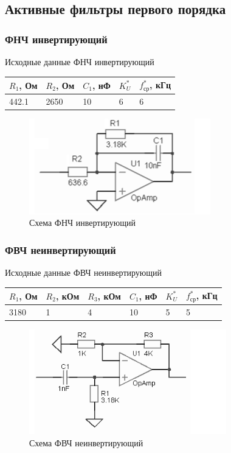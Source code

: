 \documentclass[a4paper, 12pt]{article}
\begin{document}
    \subsection{Активные фильтры первого порядка}
    \subsubsection{ФНЧ инвертирующий} \label{sec:lpinv}
    Исходные данные ФНЧ инвертирующий
    \begin{center}
        \begin{tabular}{ | m{3.5em} | m{3.5em}| m{3.5em} | m{2.5em} | m{3.5em} |} 
        \hline
        $R_1$, Ом& $R_2$, Ом &$C_1$, нФ &$K_U^*$ &$f_\text{ср}^*$, кГц\\ 
        \hline
        442.1& 2650 & 10 &6 &6\\ 
        \hline
        \end{tabular}
    \end{center}
    \begin{figure}[H]
        \centering
        \includegraphics{low_pass_m.png}
        \captionsetup{skip=0pt}
        \caption{Схема ФНЧ инвертирующий}
        \label{fig:null_scheme1}
    \end{figure}


    \subsubsection{ФВЧ неинвертирующий} \label{sec:hpninv}
    Исходные данные ФВЧ неинвертирующий
    \begin{center}
        \begin{tabular}{ | m{3.5em} | m{4em}| m{4em} | m{3.5em} | m{2.5em} | m{3.5em} |} 
        \hline
        $R_1$, Ом& $R_2$, кОм &$R_3$, кОм &$C_1$, нФ &$K_U^*$ &$f_\text{ср}^*$, кГц\\ 
        \hline
        3180& 1 &4 &10 &5 &5\\ 
        \hline
        \end{tabular}
    \end{center}
    \begin{figure}[H]
        \centering
        \includegraphics{high_pass_p.png}
        \captionsetup{skip=0pt}
        \caption{Схема ФВЧ неинвертирующий}
        \label{fig:null_scheme2}
    \end{figure}
\end{document}
